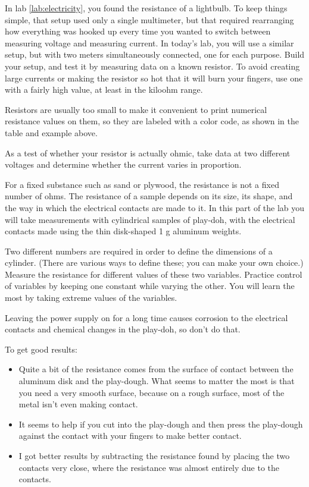 \observations


In lab \ref{lab:electricity}, you found the resistance of a lightbulb.
To keep things simple, that setup used only a single multimeter, but
that required rearranging how everything was hooked up every time you
wanted to switch between measuring voltage and measuring current.
In today's lab, you will use a similar setup, but with two meters simultaneously connected, one for each purpose.
Build your setup, and test it by measuring data on a known resistor.
To avoid creating large currents or making the resistor so hot that it
will burn your fingers, use one with a fairly high value, at least in
the kiloohm range.

Resistors are usually too small to make it convenient to
print numerical resistance values on them, so they are
labeled with a color code, as shown in the table and example above.


As a test of whether your resistor is actually ohmic, take data
at two different voltages and determine whether the current varies
in proportion.


For a fixed substance such as sand or plywood, the resistance is not
a fixed number of ohms. The resistance of a sample depends on its size,
its shape, and the way in which the electrical contacts are made to it.
In this part of the lab you will take measurements with cylindrical samples of play-doh,
with the electrical contacts made using the thin disk-shaped 1 g aluminum weights.

Two different numbers are required in order to define the dimensions of a cylinder.
(There are various ways to define these; you can make your own choice.)
Measure the resistance for different values of these two variables.
Practice control of variables by keeping one constant while varying the other.
You will learn the most by taking extreme values of the variables.

Leaving the power supply on for a long time causes corrosion to the electrical contacts
and chemical changes in the play-doh, so don't do that.

To get good results:
\begin{itemize}
\item[] Quite a bit of the resistance comes from the surface of contact between the aluminum disk
and the play-dough. What seems to
matter the most is that you need a very smooth surface, because on a rough surface, most of the
metal isn't even making contact.
\item[] It seems to help if you cut into the play-dough and then press the play-dough against the
contact with your fingers to make better contact.
\item[] I got better results by subtracting the resistance found by placing the two contacts
very close, where the resistance was almost entirely due to the contacts.
\end{itemize}


